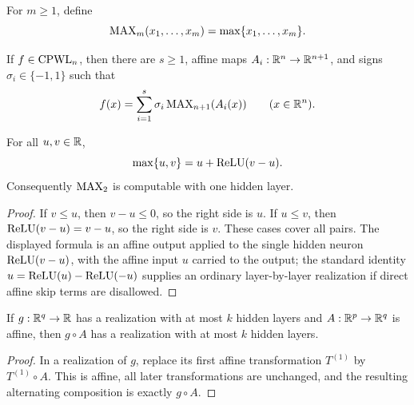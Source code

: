 \begin{definition}
  \label{def:max-function}
  For $m\geq1$, define
  \[
    \operatorname{MAX}_m(x_1,\ldots,x_m)=\max\{x_1,\ldots,x_m\}.
  \]
\end{definition}

\begin{theorem}
  \label{thm:wang-sun-representation}
  \notready
  If $f\in\operatorname{CPWL}_n$, then there are $s\geq1$, affine maps
  $A_i:\mathbb{R}^n\to\mathbb{R}^{n+1}$, and signs $\sigma_i\in\{-1,1\}$ such that
  \[
    f(x)=\sum_{i=1}^s\sigma_i\operatorname{MAX}_{n+1}(A_i(x))
    \qquad(x\in\mathbb{R}^n).
  \]
\end{theorem}

\begin{lemma}
  \label{lem:max-two-relu}
  For all $u,v\in\mathbb{R}$,
  \[
    \max\{u,v\}=u+\operatorname{ReLU}(v-u).
  \]
  Consequently $\operatorname{MAX}_2$ is computable with one hidden layer.
\end{lemma}
\begin{proof}
  If $v\leq u$, then $v-u\leq0$, so the right side is $u$.  If $u\leq v$,
  then $\operatorname{ReLU}(v-u)=v-u$, so the right side is $v$.  These cases cover all
  pairs.  The displayed formula is an affine output applied to the single
  hidden neuron $\operatorname{ReLU}(v-u)$, with the affine input $u$ carried to the output;
  the standard identity $u=\operatorname{ReLU}(u)-\operatorname{ReLU}(-u)$ supplies an ordinary
  layer-by-layer realization if direct affine skip terms are disallowed.
\end{proof}

\begin{lemma}
  \label{lem:affine-precomposition}
  If $g:\mathbb{R}^q\to\mathbb{R}$ has a realization with at most $k$ hidden layers and
  $A:\mathbb{R}^p\to\mathbb{R}^q$ is affine, then $g\circ A$ has a realization with at most
  $k$ hidden layers.
\end{lemma}
\begin{proof}
  In a realization of $g$, replace its first affine transformation $T^{(1)}$
  by $T^{(1)}\circ A$.  This is affine, all later transformations are
  unchanged, and the resulting alternating composition is exactly $g\circ A$.
\end{proof}

